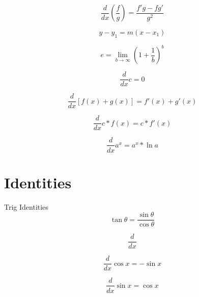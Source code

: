 \documentclass[12pt, english]{article}
\begin{document}
\noindent
{}
\begin{equation}
	\frac{d}{dx} \left(\frac{f}{g}\right) = \frac{f'g - fg'}{g^2}
\end{equation}

\noindent
{}
\begin{equation}
	y-y_1 = m(x-x_1) 
\end{equation}

\noindent
{}
\begin{equation}
	e = \lim_{b \to \infty} (1+\frac{1}{b})^b 
\end{equation}

\noindent
{}
\begin{equation}
	\frac{d}{dx} c = 0 
\end{equation}

\noindent
{}
\begin{equation}
	\frac{d}{dx} [f(x)+g(x)] = f'(x)+g'(x) 
\end{equation}

\noindent
{}
\begin{equation}
	\frac{d}{dx} c * f(x) = c * f'(x) 
\end{equation}

\noindent
{}
\begin{equation}
	\frac{d}{dx} a^x = a^x * \ln a
\end{equation}

\section{Identities}
Trig Identities
\begin{equation}
	\tan \theta = \frac{\sin \theta}{\cos \theta}
\end{equation}

\noindent
{}
\begin{equation}
	\frac{d}{dx} 
\end{equation}

\noindent
{}
\begin{equation}
	\frac{d}{dx} \cos x = -\sin x
\end{equation}

\noindent
{}
\begin{equation}
	\frac{d}{dx} \sin x = \cos x
\end{equation}
\end{document}
